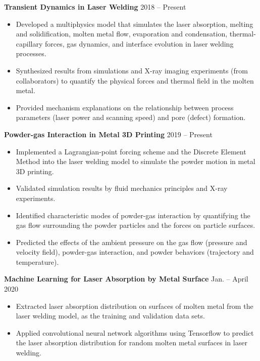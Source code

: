 \documentclass[11pt, letterpaper]{article}
\begin{document}
\textbf{Transient Dynamics in Laser Welding} \hfill 2018 -- Present
\begin{itemize}[leftmargin=*, labelsep=5mm]
   \item Developed a multiphysics model that simulates the laser absorption, melting and
      solidification, molten metal flow, evaporation and condensation, thermal-capillary forces, gas
      dynamics, and interface evolution in laser welding processes.
   \item Synthesized results from simulations and X-ray imaging experiments (from collaborators) to
      quantify the physical forces and thermal field in the molten metal.
   \item Provided mechanism explanations on the relationship between process parameters (laser power
      and scanning speed) and pore (defect) formation.
\end{itemize}

\vspace{3pt}
\textbf{Powder-gas Interaction in Metal 3D Printing} \hfill 2019 -- Present
\begin{itemize}[leftmargin=*, labelsep=5mm]
   \item Implemented a Lagrangian-point forcing scheme and the Discrete Element Method
      into the laser welding model to simulate the powder motion in metal 3D printing.
   \item Validated simulation results by fluid mechanics principles and X-ray experiments.
   \item Identified characteristic modes of powder-gas interaction by quantifying the gas flow
      surrounding the powder particles and the forces on particle surfaces.
   \item Predicted the effects of the ambient pressure on the gas flow (pressure and velocity
      field), powder-gas interaction, and powder behaviors (trajectory and temperature).
\end{itemize}

\vspace{3pt}

\textbf{Machine Learning for Laser Absorption by Metal Surface} \hfill Jan. -- April 2020
\begin{itemize}[leftmargin=*, labelsep=5mm]
   \item Extracted laser absorption distribution on surfaces of molten metal from the laser welding
      model, as the training and validation data sets.
   \item Applied convolutional neural network algorithms using Tensorflow to predict the laser
      absorption distribution for random molten metal surfaces in laser welding.
\end{itemize}
\end{document}
